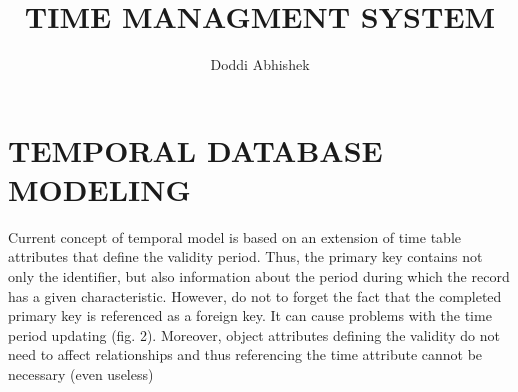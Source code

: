 \documentclass{article}
\title{TIME MANAGMENT SYSTEM}
\author{Doddi Abhishek}
\begin{document}
\maketitle



\section{TEMPORAL DATABASE MODELING}

Current concept of temporal model is based on an extension of time table attributes that define the validity period. Thus,
the primary key contains not only the identifier, but also information about the period during which the record has a
given characteristic. However, do not to forget the fact that the completed primary key is referenced as a foreign key.
It can cause problems with the time period updating (fig. 2).
Moreover, object attributes defining the validity do not need to affect relationships and thus referencing the time attribute
cannot be necessary (even useless)
\end{document}
